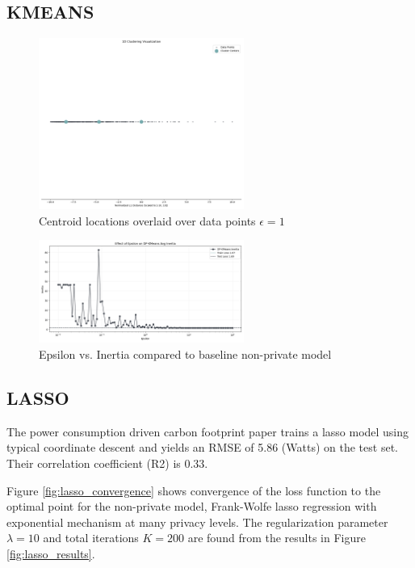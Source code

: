 \documentclass[12pt,letterpaper]{article}
\begin{document}
\subsection{KMEANS}
\begin{figure}[H]
    \centering
    \includegraphics[width=0.6\textwidth]{figure/1d_clusters.png}
    \caption{Centroid locations overlaid over data points $\epsilon=1$}
    \label{fig:centroids}
\end{figure}

\begin{figure}[H]
    \centering
    \includegraphics[width=0.6\textwidth]{figure/dpk_plot.png}
    \caption{Epsilon vs. Inertia compared to baseline non-private model}
    \label{fig:epsilon_inertia}
\end{figure}

\subsection{LASSO}

The power consumption driven carbon footprint paper trains a lasso model using typical coordinate descent and yields an RMSE of 5.86 (Watts) on the test set. Their correlation coefficient (R2) is 0.33.

Figure \ref{fig:lasso_convergence} shows convergence of the loss function to the optimal point for the non-private model, Frank-Wolfe lasso regression with exponential mechanism at many privacy levels. The regularization parameter $\lambda=10$ and total iterations $K=200$ are found from the results in Figure \ref{fig:lasso_results}.  
\end{document}
